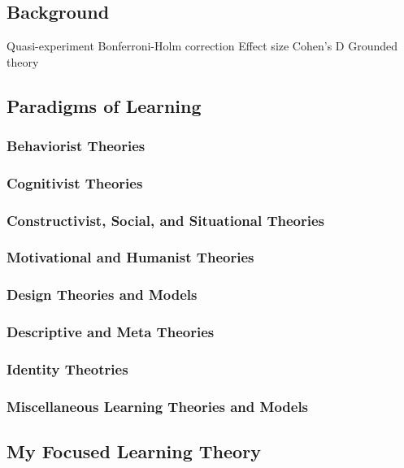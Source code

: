 \chapter[Chapter 2: Literature Review]{}

\section{Background}

Quasi-experiment
Bonferroni-Holm correction
Effect size
Cohen’s D
Grounded theory

\section{Paradigms of Learning}

\subsection{Behaviorist Theories}
\subsection{Cognitivist Theories}
\subsection{Constructivist, Social, and Situational Theories}
\subsection{Motivational and Humanist Theories}
\subsection{Design Theories and Models}
\subsection{Descriptive and Meta Theories}
\subsection{Identity Theotries}
\subsection{Miscellaneous Learning Theories and Models}

\section{My Focused Learning Theory}


